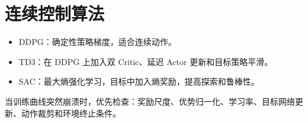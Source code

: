 \section{连续控制算法}

\begin{itemize}
  \item DDPG：确定性策略梯度，适合连续动作。
  \item TD3：在 DDPG 上加入双 Critic、延迟 Actor 更新和目标策略平滑。
  \item SAC：最大熵强化学习，目标中加入熵奖励，提高探索和鲁棒性。
\end{itemize}

\begin{questionbox}
当训练曲线突然崩溃时，优先检查：奖励尺度、优势归一化、学习率、目标网络更新、动作裁剪和环境终止条件。
\end{questionbox}
